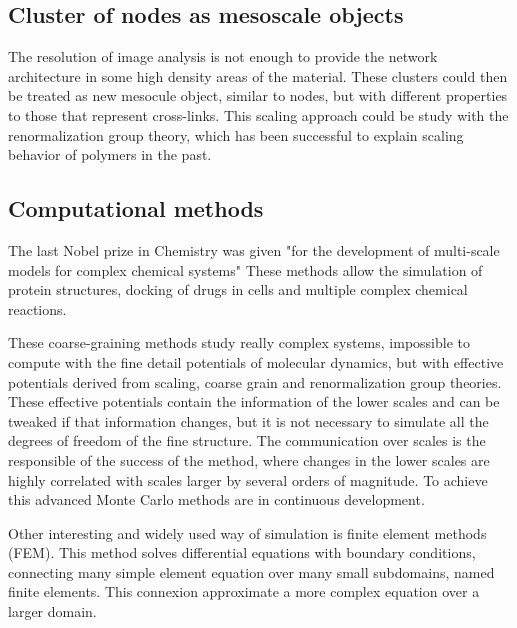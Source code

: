 \subsection{Cluster of nodes as mesoscale objects}
The resolution of image analysis is not enough to provide the network
architecture in some high density areas of the material. These clusters could
then be treated as new mesocule object, similar to nodes, but with different
properties to those that represent cross-links. This scaling approach could be
study with the renormalization group theory, which has been successful to explain
scaling behavior of polymers in the past.\citep{gennes_scaling_1979}

\subsection{Computational methods}  
The last Nobel prize in Chemistry was given "for the development of multi-scale
models for complex chemical systems" \citep{nobel:chemistry2013} These methods
allow the simulation of protein structures,  docking of drugs in cells and
multiple complex chemical reactions.

These coarse-graining methods study really complex
systems,\citep{de_pablo_coarse-grained_2011} impossible to compute with  the
fine detail potentials of molecular dynamics, but with effective potentials 
derived from scaling, coarse grain and renormalization group theories. These
effective potentials contain the information of the lower scales and can be
tweaked if that information changes, but it is not necessary to simulate all the
degrees of freedom of the fine structure. The communication over scales is the
responsible of the success of the method, where changes in the lower scales are
highly correlated with scales larger by several orders of magnitude. To achieve
this advanced Monte Carlo methods are in continuous development.
\citep{karayiannis_novel_2002}

Other interesting and widely used way of simulation is finite element methods
(FEM). This method solves differential equations with boundary conditions,
connecting many simple element equation over many small subdomains, named finite
elements. This connexion approximate a more complex equation over a larger
domain.




